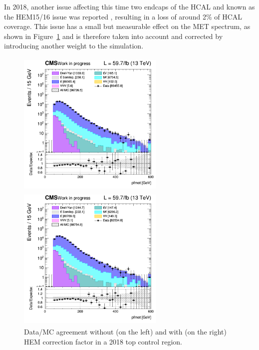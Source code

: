 \documentclass[a4paper, 10pt, openright]{report}
\begin{document}
In 2018, another issue affecting this time two endcaps of the \ac{HCAL} and known as the HEM15/16 issue was reported \cite{HEM}, resulting in a loss of around 2\% of \ac{HCAL} coverage. This issue has a small but measurable effect on the \ac{MET} spectrum, as shown in Figure~\ref{fig:HEM} and is therefore taken into account and corrected by introducing another weight to the simulation.

\begin{figure}[htbp]
\begin{center}
\begin{minipage}[b]{.48\textwidth}
\includegraphics[width=7cm, height=7cm]{figs/log_cratio_ttbarCR_ll_METcorrected_pt_no_hem.png}
\end{minipage} \hfill
\begin{minipage}[b]{.48\textwidth}
\includegraphics[width=7cm, height=7cm]{figs/log_cratio_ttbarCR_ll_METcorrected_pt_hem.png}
\end{minipage} \hfill
\caption{Data/\ac{MC} agreement without (on the left) and with (on the right) HEM correction factor in a 2018 top control region.}
\label{fig:HEM}
\end{center}
\end{figure}
\end{document}
